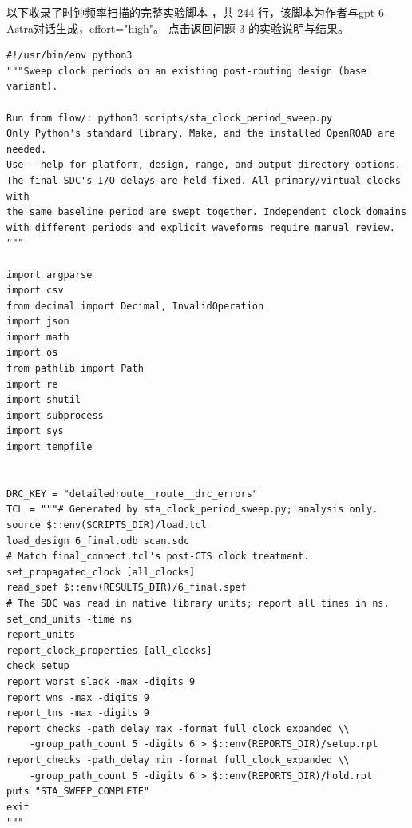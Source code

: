 \documentclass[UTF8,a4paper,11pt,fontset=fandol]{ctexart}
\begin{document}
以下收录了时钟频率扫描的完整实验脚本
，共 244 行，该脚本为作者与gpt-6-Astra对话生成，effort="high"。
\hyperref[sec:q3]{点击返回问题 3 的实验说明与结果}。

\begingroup
\linespread{0.96}\selectfont
\begin{lstlisting}[style=script]
#!/usr/bin/env python3
"""Sweep clock periods on an existing post-routing design (base variant).

Run from flow/: python3 scripts/sta_clock_period_sweep.py
Only Python's standard library, Make, and the installed OpenROAD are needed.
Use --help for platform, design, range, and output-directory options.
The final SDC's I/O delays are held fixed. All primary/virtual clocks with
the same baseline period are swept together. Independent clock domains
with different periods and explicit waveforms require manual review.
"""

import argparse
import csv
from decimal import Decimal, InvalidOperation
import json
import math
import os
from pathlib import Path
import re
import shutil
import subprocess
import sys
import tempfile


DRC_KEY = "detailedroute__route__drc_errors"
TCL = """# Generated by sta_clock_period_sweep.py; analysis only.
source $::env(SCRIPTS_DIR)/load.tcl
load_design 6_final.odb scan.sdc
# Match final_connect.tcl's post-CTS clock treatment.
set_propagated_clock [all_clocks]
read_spef $::env(RESULTS_DIR)/6_final.spef
# The SDC was read in native library units; report all times in ns.
set_cmd_units -time ns
report_units
report_clock_properties [all_clocks]
check_setup
report_worst_slack -max -digits 9
report_wns -max -digits 9
report_tns -max -digits 9
report_checks -path_delay max -format full_clock_expanded \\
    -group_path_count 5 -digits 6 > $::env(REPORTS_DIR)/setup.rpt
report_checks -path_delay min -format full_clock_expanded \\
    -group_path_count 5 -digits 6 > $::env(REPORTS_DIR)/hold.rpt
puts "STA_SWEEP_COMPLETE"
exit
"""



\end{lstlisting}
\end{document}
